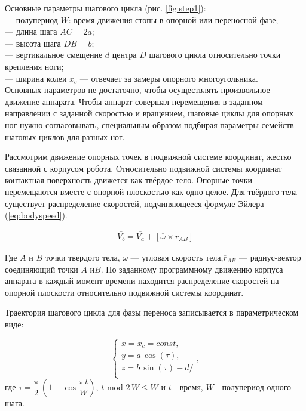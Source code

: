 Основные параметры шагового цикла (рис. \ref{fig:step1}):\\
--- полупериод $W$: время движения стопы в опорной или переносной фазе;\\
--- длина шага $AC = 2a$;\\
--- высота шага $DB = b$;\\
--- вертикальное смещение $d$ центра $D$ шагового цикла относительно точки крепления ноги;\\
--- ширина колеи $x_c$ --- отвечает за замеры опорного многоугольника. \\

Основных параметров не достаточно, чтобы осуществлять произвольное движение аппарата.
Чтобы аппарат совершал перемещения в заданном направлении с заданной скоростью и вращением, шаговые циклы для опорных ног нужно согласовывать, специальным образом подбирая параметры семейств шаговых циклов для разных ног. 

Рассмотрим движение опорных точек в подвижной системе координат, жестко связанной с корпусом робота. Относительно подвижной системы координат контактная поверхность движется как твёрдое тело. Опорные точки перемещаются вместе с опорной плоскостью как одно целое. Для твёрдого тела существует распределение скоростей, подчиняющееся формуле Эйлера (\ref{eq:bodyspeed}).

 \begin{equation}
 \begin{array}{lcr}
 \overline{V_b} = \overline{V_a} + [\overline{\omega} \times \overline{r_{AB}}]
 \end{array}
 \label{eq:bodyspeed}
 \end{equation}
 
Где $A$ и $B$ точки твердого тела, $\omega$ --- угловая скорость тела,$\overline{r}_{AB}$ --- радиус-вектор соединяющий точки $A$ и$B$.
По заданному программному движению корпуса аппарата в каждый момент времени находится распределение скоростей на опорной плоскости относительно подвижной системы координат.

Траектория шагового цикла для фазы переноса записывается в параметрическом виде:

\begin{equation}
\left\{
\begin{array}{lcr}
x = x_c=const,\\
y = a\,\cos(\tau),\\
z = b\,\sin(\tau)-d/\\
\end{array}
\right.,
\label{eq:stand}
 \end{equation}
где $\tau = \dfrac{\pi}{2}\,\left(1-\cos\dfrac{\pi\,t}{W}\right)$, $t$ mod $2\,W\leq W$ и $t$---время, $W$---полупериод одного шага.

